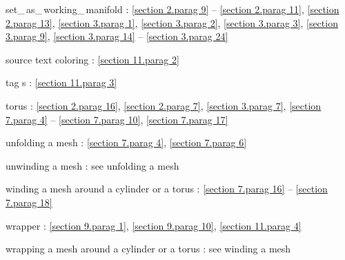 \documentclass[a4paper]{scrreprt}
\def\numb{}
\renewcommand\tt{\normalfont\ttfamily}
\begin{document}
\noindent
{\small\tt set\_\,as\_\,working\_\,manifold} :
\ref{\numb section 2.\numb parag 9} -- \ref{\numb section 2.\numb parag 11},
\ref{\numb section 2.\numb parag 13}, \ref{\numb section 3.\numb parag 1},
\ref{\numb section 3.\numb parag 2}, \ref{\numb section 3.\numb parag 3},
\ref{\numb section 3.\numb parag 9},
\ref{\numb section 3.\numb parag 14} -- \ref{\numb section 3.\numb parag 24}

\noindent
source text coloring : \ref{\numb section 11.\numb parag 2}

\noindent
{\small\tt\textcolor{tag}{tag}}\hskip0.5pt s : \ref{\numb section 11.\numb parag 3}

\noindent
torus : \ref{\numb section 2.\numb parag 16}, \ref{\numb section 2.\numb parag 7},
\ref{\numb section 3.\numb parag 7},
\ref{\numb section 7.\numb parag 4} -- \ref{\numb section 7.\numb parag 10},
\ref{\numb section 7.\numb parag 17}

\noindent
unfolding a mesh : \ref{\numb section 7.\numb parag 4}, \ref{\numb section 7.\numb parag 6}

\noindent
unwinding a mesh : see unfolding a mesh

\noindent
winding a mesh around a cylinder or a torus : \ref{\numb section 7.\numb parag 16} --
\ref{\numb section 7.\numb parag 18}

\noindent
wrapper : \ref{\numb section 9.\numb parag 1}, \ref{\numb section 9.\numb parag 10},
\ref{\numb section 11.\numb parag 4}

\noindent
wrapping a mesh around a cylinder or a torus : see winding a mesh
\end{document}
